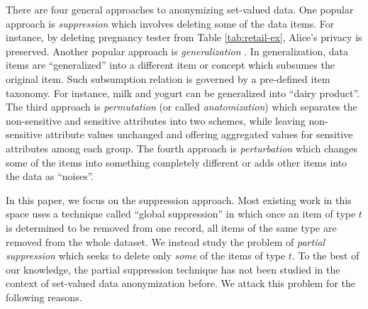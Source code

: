 
There are four general approaches to anonymizing set-valued data.
One popular approach is {\em suppression} \cite{Xu:2008:ATD,Cao:2010:rho}
which involves deleting some of the data items. For instance, by deleting
pregnancy tester from Table \ref{tab:retail-ex}, Alice's privacy is
preserved. Another popular approach is {\em generalization}
\cite{Cao:2010:rho}. In generalization, data items are ``generalized'' into a
different item or concept which subsumes the original item. Such subsumption
relation is governed by a pre-defined item taxonomy. For instance, milk and
yogurt can be generalized into ``dairy product''. The third approach is {\em
permutation} (or called {\em anatomization})
\cite{Xiao:2006:Anatomy,2011:TKDE:Anonymous} which separates the non-sensitive
and sensitive attributes into two schemes, while leaving non-sensitive
attribute values unchanged and offering aggregated values for sensitive
attributes among each group. The
fourth approach is {\em perturbation} \cite{ChenMFDX11:Diff}
which changes some of the items into
something completely different or adds other items into the data as ``noises''.




In this paper, we focus on the suppression
approach. Most existing work in this space uses a technique called ``global
suppression'' \cite{Cao:2010:rho} in which once an item of type $t$ is
determined to be removed from one record, all items of the same type are
removed from the whole dataset. We instead study the problem of {\em partial
suppression} which seeks to delete only {\em some} of the items of type $t$.
To the best of our knowledge, the partial suppression technique has not been
studied in the context of set-valued data anonymization before. We attack
this problem for the following reasons.


